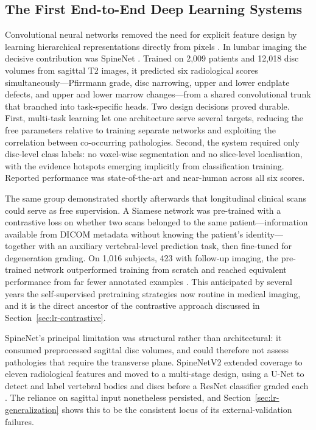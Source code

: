 \subsection{The First End-to-End Deep Learning Systems}
\label{sec:lr-first-dl}

Convolutional neural networks removed the need for explicit feature design by
learning hierarchical representations directly from pixels \cite{he2016deep}. In
lumbar imaging the decisive contribution was SpineNet
\cite{jamaludin2017spinenet}. Trained on 2{,}009 patients and 12{,}018 disc
volumes from sagittal T2 images, it predicted six radiological scores
simultaneously---Pfirrmann grade, disc narrowing, upper and lower endplate
defects, and upper and lower marrow changes---from a shared convolutional trunk
that branched into task-specific heads. Two design decisions proved durable.
First, multi-task learning let one architecture serve several targets, reducing
the free parameters relative to training separate networks and exploiting the
correlation between co-occurring pathologies. Second, the system required only
disc-level class labels: no voxel-wise segmentation and no slice-level
localisation, with the evidence hotspots emerging implicitly from classification
training. Reported performance was state-of-the-art and near-human across all
six scores.

The same group demonstrated shortly afterwards that longitudinal clinical scans
could serve as free supervision. A Siamese network was pre-trained with a
contrastive loss on whether two scans belonged to the same patient---information
available from DICOM metadata without knowing the patient's identity---together
with an auxiliary vertebral-level prediction task, then fine-tuned for
degeneration grading. On 1{,}016 subjects, 423 with follow-up imaging, the
pre-trained network outperformed training from scratch and reached equivalent
performance from far fewer annotated examples \cite{jamaludin2017selfsupervised}.
This anticipated by several years the self-supervised pretraining strategies now
routine in medical imaging, and it is the direct ancestor of the contrastive
approach discussed in Section~\ref{sec:lr-contrastive}.

SpineNet's principal limitation was structural rather than architectural: it
consumed preprocessed sagittal disc volumes, and could therefore not assess
pathologies that require the transverse plane. SpineNetV2 extended coverage to
eleven radiological features and moved to a multi-stage design, using a U-Net to
detect and label vertebral bodies and discs before a ResNet classifier graded
each \cite{windsor2022spinenetv2}. The reliance on sagittal input nonetheless
persisted, and Section~\ref{sec:lr-generalization} shows this to be the
consistent locus of its external-validation failures.

